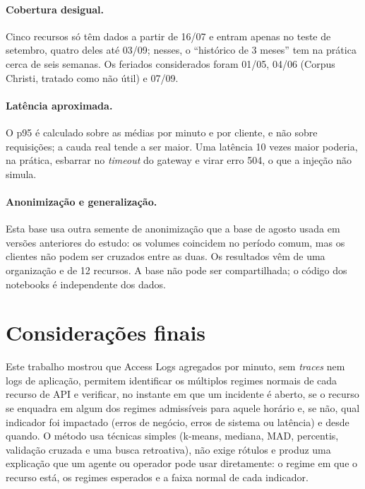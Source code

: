 \documentclass[sigconf,nonacm]{acmart}
\begin{document}
\paragraph{Cobertura desigual.} Cinco recursos só têm dados a partir de 16/07 e entram apenas no teste de setembro, quatro deles até 03/09; nesses, o ``histórico de 3 meses'' tem na prática cerca de seis semanas. Os feriados considerados foram 01/05, 04/06 (Corpus Christi, tratado como não útil) e 07/09.

\paragraph{Latência aproximada.} O p95 é calculado sobre as médias por minuto e por cliente, e não sobre requisições; a cauda real tende a ser maior. Uma latência 10 vezes maior poderia, na prática, esbarrar no \emph{timeout} do gateway e virar erro 504, o que a injeção não simula.

\paragraph{Anonimização e generalização.} Esta base usa outra semente de anonimização que a base de agosto usada em versões anteriores do estudo: os volumes coincidem no período comum, mas os clientes não podem ser cruzados entre as duas. Os resultados vêm de uma organização e de 12 recursos. A base não pode ser compartilhada; o código dos notebooks é independente dos dados.

\section{Considerações finais}\label{sec:conclusao}

Este trabalho mostrou que Access Logs agregados por minuto, sem \emph{traces} nem logs de aplicação, permitem identificar os múltiplos regimes normais de cada recurso de API e verificar, no instante em que um incidente é aberto, se o recurso se enquadra em algum dos regimes admissíveis para aquele horário e, se não, qual indicador foi impactado (erros de negócio, erros de sistema ou latência) e desde quando. O método usa técnicas simples (k-means, mediana, MAD, percentis, validação cruzada e uma busca retroativa), não exige rótulos e produz uma explicação que um agente ou operador pode usar diretamente: o regime em que o recurso está, os regimes esperados e a faixa normal de cada indicador.
\end{document}
